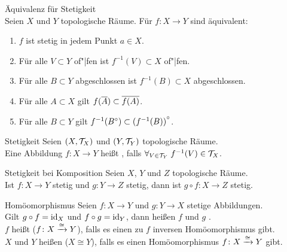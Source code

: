 \begin{Satz}{Äquivalenz für Stetigkeit} \\
    Seien $X$ und $Y$ topologische Räume.
    Für $f\colon X \rightarrow Y$ sind äquivalent:
    \begin{enumerate}
        \item
        $f$ ist stetig in jedem Punkt $a \in X$.

        \item
        Für alle $V \subset Y$ of"|fen ist $f^{-1}(V) \subset X$ of"|fen.

        \item
        Für alle $B \subset Y$ abgeschlossen ist $f^{-1}(B) \subset X$
        abgeschlossen.

        \item
        Für alle $A \subset X$ gilt
        $f(\overline{A}) \subset \overline{f(A)}$.

        \item
        Für alle $B \subset Y$ gilt
        $f^{-1}({B}^\circ) \subset {(f^{-1}(B))}^\circ$.
    \end{enumerate}
\end{Satz}

\begin{Def}{Stetigkeit}
    Seien $(X, \mathcal{T}_X)$ und $(Y, \mathcal{T}_Y)$ topologische Räume. \\
    Eine Abbildung $f\colon X \rightarrow Y$ heißt , falls
    $\forall_{V \in \mathcal{T}_Y}\; f^{-1}(V) \in \mathcal{T}_X$.
\end{Def}

\begin{Satz}{Stetigkeit bei Komposition}
    Seien $X$, $Y$ und $Z$ topologische Räume. \\
    Ist $f\colon X \rightarrow Y$ stetig und
    $g\colon Y \rightarrow Z$ stetig, dann ist
    $g \circ f\colon X \rightarrow Z$ stetig.
\end{Satz}

\linie
\pagebreak

\begin{Def}{Homöomorphismus}
    Seien $f\colon X \rightarrow Y$ und $g\colon Y \rightarrow X$ stetige
    Abbildungen. \\
    Gilt $g \circ f = \operatorname{id}_X$ und $f \circ g = \operatorname{id}_Y$, dann heißen $f$ und $g$
    . \\
    $f$ heißt  ($f\colon X \xrightarrow{\cong} Y$), falls es einen
    zu $f$ inversen Homöomorphismus gibt. \\
    $X$ und $Y$ heißen  ($X \cong Y$), falls
    es einen Homöomorphismus $f\colon X \xrightarrow{\cong} Y$ gibt.
\end{Def}

